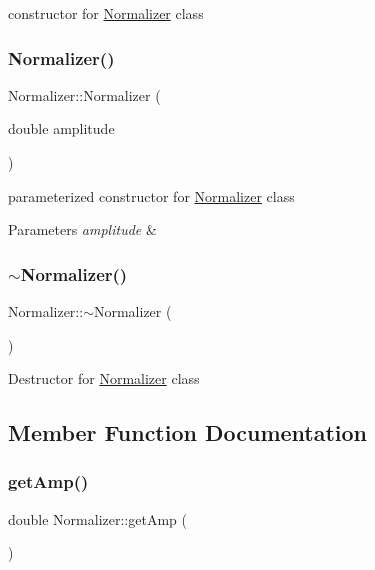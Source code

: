 constructor for \hyperlink{classNormalizer}{Normalizer} class \mbox{\label{classNormalizer_a9178648f9e33be07b9740c64af552efe}} 
\subsubsection{\texorpdfstring{Normalizer()}{Normalizer()}\hspace{0.1cm}{\footnotesize\ttfamily [2/2]}}
{\footnotesize\ttfamily Normalizer\+::\+Normalizer (\begin{DoxyParamCaption}\item[{double}]{amplitude }\end{DoxyParamCaption})}

parameterized constructor for \hyperlink{classNormalizer}{Normalizer} class 
\begin{DoxyParams}{Parameters}
{\em amplitude} & \\
\hline
\end{DoxyParams}
\mbox{\label{classNormalizer_aa6437195b1223879aa1f14f211a965b5}} 
\subsubsection{\texorpdfstring{$\sim$\+Normalizer()}{~Normalizer()}}
{\footnotesize\ttfamily Normalizer\+::$\sim$\+Normalizer (\begin{DoxyParamCaption}{ }\end{DoxyParamCaption})\hspace{0.3cm}{\ttfamily [virtual]}}

Destructor for \hyperlink{classNormalizer}{Normalizer} class 

\subsection{Member Function Documentation}
\mbox{\label{classNormalizer_a919c2540717d44dc354f8fed1d56b891}} 
\subsubsection{\texorpdfstring{get\+Amp()}{getAmp()}}
{\footnotesize\ttfamily double Normalizer\+::get\+Amp (\begin{DoxyParamCaption}{ }\end{DoxyParamCaption})}

